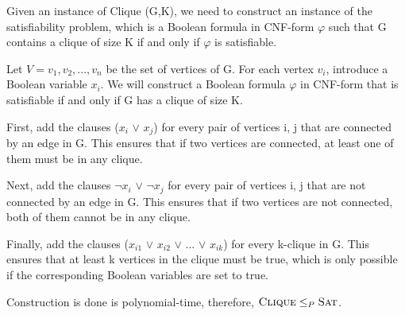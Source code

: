 \documentclass[12pt]{article}
\newcommand{\SAT}{\textsf{\sc Sat}}
\newcommand{\CLIQUE}{\textsf{\sc Clique}}
\newenvironment{solution}{{\noindent\bf Solution:}}{\vspace{5mm}}
\begin{document}
\begin{solution}
      
      Given an instance of Clique (G,K), 
      we need to construct an instance of the satisfiability problem, 
      which is a Boolean formula in CNF-form $\varphi$ such that G contains a 
      clique of size K if and only if $\varphi$ is satisfiable.

      Let $V = {v_1, v_2, ..., v_n}$ be the set of vertices of G. 
      For each vertex $v_i$, introduce a Boolean variable $x_i$. 
      We will construct a Boolean formula $\varphi$ in CNF-form that is satisfiable if and only if G has a clique of size K.

      First, add the clauses ($x_i$ $\lor$ $x_j$) for every pair of vertices i, j that are connected by an edge in G. This ensures that if two vertices are connected, at least one of them must be in any clique.

      Next, add the clauses $\neg x_i$ $\lor$ $\neg x_j$ for every pair of vertices i, j that are not connected by an edge in G. This ensures that if two vertices are not connected, both of them cannot be in any clique.

      Finally, add the clauses ($x_{i1}$ $\lor$ $x_{i2}$ $\lor$ ... $\lor$ $x_{ik}$) for every k-clique in G. This ensures that at least k vertices in the clique must be true, which is only possible if the corresponding Boolean variables are set to true.

      Construction is done is polynomial-time, therefore, $\CLIQUE \leq_P \SAT$.
\end{solution}
\end{document}
